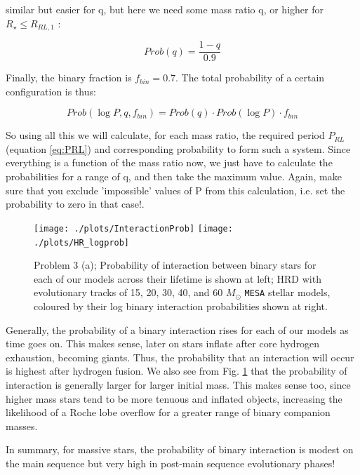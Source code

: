 \documentclass[11pt]{article}
\newcommand{\msol}{M_\odot}
\begin{document}
similar but easier for q, but here we need some mass ratio q, or higher for $ R_{\star} \leq R_{RL,1}$ :

\begin{equation}
Prob(q) = \frac{ 1-q }{ 0.9 }
\end{equation}

Finally, the binary fraction is $f_{bin} = 0.7$.
The total probability of a certain configuration is thus:

\begin{equation}
Prob(\log P, q, f_{bin}) = Prob(q) \cdot Prob(\log P) \cdot f_{bin}
\end{equation}

So using all this we will calculate, for each mass ratio, the required period $P_{RL}$ (equation \ref{eq:PRL}) and corresponding probability to form such a system.
Since everything is a function of the mass ratio now, we just have to calculate the probabilities for a range of q, and then take the maximum value. Again, make sure that you exclude 'impossible' values of P from this calculation, i.e. set the probability to zero in that case!.


\begin{figure}
\center
\texttt{[image: ./plots/InteractionProb]}
\texttt{[image: ./plots/HR\_logprob]}
    \caption{Problem 3 (a); Probability of interaction between binary stars for each of our models across their lifetime is shown at       left; HRD with evolutionary tracks of 15, 20, 30, 40, and 60  $\msol$ \texttt{MESA} stellar models, coloured by their log binary interaction probabilities shown at right. }
    \label{fig:p3_a}
\end{figure}


Generally, the probability of a binary interaction rises for each of our models as time goes on. This makes sense, later on stars inflate after core hydrogen exhaustion, becoming giants. Thus, the probability that an interaction will occur is highest after hydrogen fusion. We also see from Fig. \ref{fig:p3_a} that the probability of interaction is generally larger for larger initial mass. This makes sense too, since higher mass stars tend to be more tenuous and inflated objects, increasing the likelihood of a Roche lobe overflow for a greater range of binary companion masses. 

In summary, for massive stars, the probability of binary interaction is modest on the main sequence but very high in post-main sequence evolutionary phases!
\end{document}
